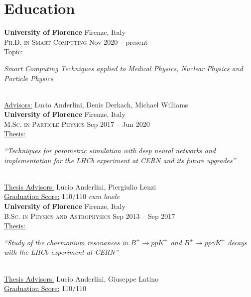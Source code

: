 \newcommand{\university}[2]
  {\large \textbf{\color{hlcolor-0} #1} \hfill {\color{hlcolor-2} #2}}
  
\newcommand{\degree}[2]
  {\small \color{hlcolor-1} 
  {\color{iconcolor} \faGraduationCap}
  \textsc{#1} \hfill {#2}}
  
\newcommand{\worktitle}[2]
  {\normalsize \color{maincolor}
    \ul{#1:}
    \begin{minipage}[t]{0.75\linewidth}
      \begin{flushleft}
        \emph{#2}
      \end{flushleft}
    \end{minipage}}


\section*{Education}
\begin{cvcontent}
  \university{University of Florence}{Firenze, Italy}\\
  \degree{Ph.D. in Smart Computing}{Nov 2020 -- present}\\ [1mm]
  \worktitle{Topic}{Smart Computing Techniques applied to Medical
  Physics, Nuclear Physics and Particle Physics}\\ [1.5mm]
  \ul{Advisors:} Lucio Anderlini, Denis Derkach, Michael Williams 
  \\ [5mm]
  \university{University of Florence}{Firenze, Italy}\\
  \degree{M.Sc. in Particle Physics}{Sep 2017 -- Jun 2020}\\ [1mm]
  \worktitle{Thesis}{``Techniques for parametric simulation with deep neural networks and implementation for the LHCb experiment at CERN
  and its future upgrades''}\\ [1.5mm]
  \ul{Thesis Advisors:} Lucio Anderlini, Piergiulio Lenzi\\ [0.5mm]
  \ul{Graduation Score:} 110/110 \emph{cum laude}
  \\ [5mm]
  \university{University of Florence}{Firenze, Italy}\\
  \degree{B.Sc. in Physics and Astrophysics}{Sep 2013 -- Sep 2017}\\ [1mm]
  \worktitle{Thesis}{``Study of the charmonium resonances in 
      $B^+ \to p \bar{p} K^+$ and $B^+ \to p \bar{p} \gamma K^+$
      decays with the LHCb experiment at CERN''}\\ [1.5mm]
  \ul{Thesis Advisors:} Lucio Anderlini, Giuseppe Latino\\ [0.5mm]
  \ul{Graduation Score:} 110/110
\end{cvcontent}